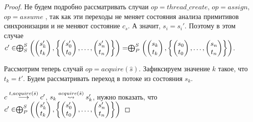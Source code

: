 \begin{proof}
Не будем подробно рассматривать случаи $op = thread\_create$, $op = assign$, $op = assume$
, так как эти переходы не меняет состояния анализа примитивов синхронизации и не меняют состояние $c_s$.
А значит, $s_i = s_i'$.
Поэтому в этом случае $c' \in \mathrel{\bigoplus}^S_S
\left(
\begin{pmatrix}
s_k' \\
t_k 
\end{pmatrix},
\left\{
\begin{pmatrix}
s_0' \\
t_0 
\end{pmatrix},
\dots ,
\begin{pmatrix}
s_n' \\
t_n 
\end{pmatrix}
\right\}
\right) = 
\mathrel{\bigoplus}^S_P
\left(
\begin{pmatrix}
s_k \\
t_k 
\end{pmatrix},
\left\{
\begin{pmatrix}
s_0 \\
t_0 
\end{pmatrix},
\dots ,
\begin{pmatrix}
s_n \\
t_n 
\end{pmatrix}
\right\}
\right)$.

Рассмотрим теперь случай $op = acquire(\hat s)$. Зафиксируем значение $k$ такое, что $t_k = t'$. Будем рассматривать переход в потоке из состояния $s_k$.

$c \stackrel{t, acquire(\hat s)}{\longrightarrow} c'$, $s_k \stackrel{acquire(\hat s)}{\leadsto} s_k'$, нужно показать, что 
$c' \in \mathrel{\bigoplus}^S_P
\left(
\begin{pmatrix}
s_k' \\
t_k 
\end{pmatrix},
\left\{
\begin{pmatrix}
s_0' \\
t_0 
\end{pmatrix},
\dots ,
\begin{pmatrix}
s_n' \\
t_n 
\end{pmatrix}
\right\}
\right)$


\end{proof}
